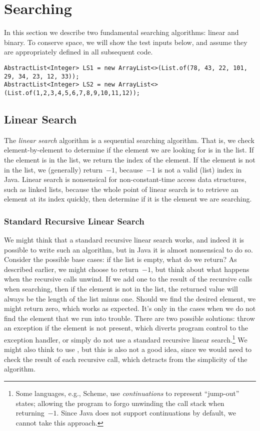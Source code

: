 \section{Searching}
In this section we describe two fundamental searching algorithms: linear and binary.
To conserve space, we will show the test inputs below, and assume they are appropriately defined in all subsequent code.

\begin{small}
\begin{verbatim}
AbstractList<Integer> LS1 = new ArrayList<>(List.of(78, 43, 22, 101, 29, 34, 23, 12, 33));
AbstractList<Integer> LS2 = new ArrayList<>(List.of(1,2,3,4,5,6,7,8,9,10,11,12));
\end{verbatim}  
\end{small}

\subsection{Linear Search}
The \emph{linear search} algorithm is a sequential searching algorithm. 
That is, we check element-by-element to determine if the element we are looking for is in the list. 
If the element is in the list, we return the index of the element. 
If the element is not in the list, we (generally) return~$-1$, because~$-1$ is not a valid (list) index in Java. 
Linear search is nonsensical for non-constant-time access data structures, such as linked lists, because the whole point of linear search is to retrieve an element at its index quickly, then determine if it is the element we are searching. 

\subsubsection*{Standard Recursive Linear Search}
We might think that a standard recursive linear search works, and indeed it is possible to write such an algorithm, but in Java it is almost nonsensical to do so. 
Consider the possible base cases: if the list is empty, what do we return? 
As described earlier, we might choose to return~$-1$, but think about what happens when the recursive calls unwind. 
If we add one to the result of the recursive calls when searching, then if the element is not in the list, the returned value will always be the length of the list minus one. 
Should we find the desired element, we might return zero, which works as expected. 
It's only in the cases when we do not find the element that we run into trouble. There are two possible solutions: throw an exception if the element is not present, which diverts program control to the exception handler, or simply do not use a standard recursive linear search.\footnote{Some languages, e.g., Scheme, use \emph{continuations} to represent ``jump-out'' states; allowing the program to forgo unwinding the call stack when returning~$-1$. Since Java does not support continuations by default, we cannot take this approach.} 
We might also think to use , but this is also not a good idea, since we would need to check the result of each recursive call, which detracts from the simplicity of the algorithm.


